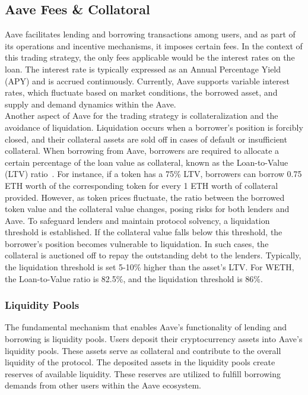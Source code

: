 \subsection{Aave Fees \& Collatoral}
Aave facilitates lending and borrowing transactions among users, and as part of its operations and incentive mechanisms, it imposes certain fees. In the context of this trading strategy, the only fees applicable would be the interest rates on the loan. The interest rate is typically expressed as an Annual Percentage Yield (APY) and is accrued continuously. Currently, Aave supports variable interest rates, which fluctuate based on market conditions, the borrowed asset, and supply and demand dynamics within the Aave.
\\[5mm]
Another aspect of Aave for the trading strategy is collateralization and the avoidance of liquidation. Liquidation occurs when a borrower's position is forcibly closed, and their collateral assets are sold off in cases of default or insufficient collateral. When borrowing from Aave, borrowers are required to allocate a certain percentage of the loan value as collateral, known as the Loan-to-Value (LTV) ratio~\cite{aave_risk}. For instance, if a token has a 75\% LTV, borrowers can borrow 0.75 ETH worth of the corresponding token for every 1 ETH worth of collateral provided. However, as token prices fluctuate, the ratio between the borrowed token value and the collateral value changes, posing risks for both lenders and Aave. To safeguard lenders and maintain protocol solvency, a liquidation threshold is established. If the collateral value falls below this threshold, the borrower's position becomes vulnerable to liquidation. In such cases, the collateral is auctioned off to repay the outstanding debt to the lenders. Typically, the liquidation threshold is set 5-10\% higher than the asset's LTV. For WETH, the Loan-to-Value ratio is 82.5\%, and the liquidation threshold is 86\%.


\subsubsection{Liquidity Pools}

The fundamental mechanism that enables Aave's functionality of lending and borrowing is liquidity pools. Users deposit their cryptocurrency assets into Aave's liquidity pools. These assets serve as collateral and contribute to the overall liquidity of the protocol. The deposited assets in the liquidity pools create reserves of available liquidity. These reserves are utilized to fulfill borrowing demands from other users within the Aave ecosystem.

